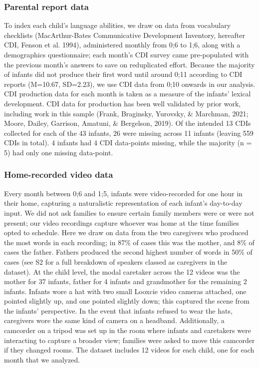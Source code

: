 \documentclass[
  man,mask,floatsintext]{apa6}
\begin{document}
\hypertarget{parental-report-data}{%
\subsubsection{Parental report data}\label{parental-report-data}}

To index each child's language abilities, we draw on data from vocabulary checklists (MacArthur-Bates Communicative Development Inventory, hereafter CDI, Fenson et al. 1994), administered monthly from 0;6 to 1;6, along with a demographics questionnaire; each month's CDI survey came pre-populated with the previous month's answers to save on reduplicated effort. Because the majority of infants did not produce their first word until around 0;11 according to CDI reports (M=10.67, SD=2.23), we use CDI data from 0;10 onwards in our analysis. CDI production data for each month is taken as a measure of the infants' lexical development. CDI data for production has been well validated by prior work, including work in this sample (Frank, Braginsky, Yurovsky, \& Marchman, 2021; Moore, Dailey, Garrison, Amatuni, \& Bergelson, 2019). Of the intended 13 CDIs collected for each of the 43 infants, 26 were missing across 11 infants (leaving 559 CDIs in total). 4 infants had 4 CDI data-points missing, while the majority (n = 5) had only one missing data-point.

\hypertarget{home-recorded-video-data}{%
\subsubsection{Home-recorded video data}\label{home-recorded-video-data}}

Every month between 0;6 and 1;5, infants were video-recorded for one hour in their home, capturing a naturalistic representation of each infant's day-to-day input. We did not ask families to ensure certain family members were or were not present; our video recordings capture whoever was home at the time families opted to schedule. Here we draw on data from the two caregivers who produced the most words in each recording; in 87\% of cases this was the mother, and 8\% of cases the father. Fathers produced the second highest number of words in 50\% of cases (see S2 for a full breakdown of speakers classed as caregivers in the dataset). At the child level, the modal caretaker across the 12 videos was the mother for 37 infants, father for 4 infants and grandmother for the remaining 2 infants. Infants wore a hat with two small Looxcie video cameras attached, one pointed slightly up, and one pointed slightly down; this captured the scene from the infants' perspective. In the event that infants refused to wear the hats, caregivers wore the same kind of camera on a headband. Additionally, a camcorder on a tripod was set up in the room where infants and caretakers were interacting to capture a broader view; families were asked to move this camcorder if they changed rooms. The dataset includes 12 videos for each child, one for each month that we analyzed.
\end{document}
